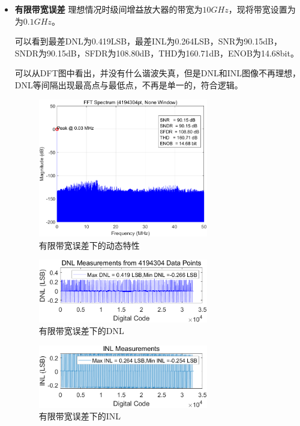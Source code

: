 \documentclass[cs4size,a4paper]{ctexart}
\numberwithin{equation}{section}
\numberwithin{table}{section}
\numberwithin{figure}{section}
\begin{document}
\begin{itemize}
		\item \textbf{有限带宽误差} 理想情况时级间增益放大器的带宽为$10GHz$，现将带宽设置为为$0.1GHz$。
		
		可以看到最差DNL为0.419LSB，最差INL为0.264LSB，SNR为90.15dB，SNDR为90.15dB，SFDR为108.80dB，THD为160.71dB，ENOB为14.68bit。
		
		可以从DFT图中看出，并没有什么谐波失真，但是DNL和INL图像不再理想，DNL等间隔出现最高点与最低点，不再是单一的，符合逻辑。
		\begin{figure}[H]
			\centering
			\includegraphics[width=0.7\textwidth]{pic/GBW/DFT.png}
			\caption{有限带宽误差下的动态特性} 
		\end{figure}

		\begin{figure}[H]
			\centering
			\includegraphics[width=0.7\textwidth]{pic/GBW/DNL.png}
			\caption{有限带宽误差下的DNL} 
		\end{figure}

		\begin{figure}[H]
			\centering
			\includegraphics[width=0.7\textwidth]{pic/GBW/INL.png}
			\caption{有限带宽误差下的INL} 
		\end{figure}


\end{itemize}
\end{document}

